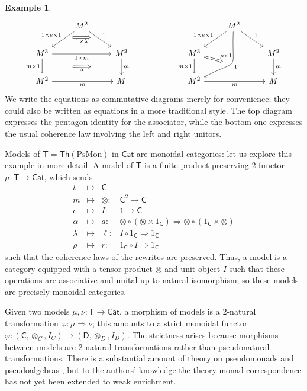 \documentclass{amsart}
\theoremstyle{definition}
\newtheorem{example}[theorem]{Example}
\newcommand{\Th}{\mathsf{Th}}
\newcommand{\Cat}{\mathsf{Cat}}
\newcommand{\D}{\mathsf{D}}
\newcommand{\C}{\mathsf{C}}
\newcommand{\T}{\mathsf{T}}
\newcommand{\maps}{\colon}
\begin{document}
\begin{example}
      \[\begin{tikzcd}
          & M^2 \ar[dl,"1\times e\times 1",""name=a1,swap] \ar[dr,"1",""name=a2] \arrow[Rightarrow,from=a1,to=a2,"1\times \lambda",swap,shorten >=0.4cm,shorten <=0.4cm] & && & M^2 \ar[dl,"1\times e\times 1",swap] \ar[dr,"1"] \ar[ddl,bend left =30,looseness=2, "1",""name=c1] & \\
          M^3 \ar[d,"m\times 1",swap,""name=b1] \ar[rr,"1\times m",swap] && M^2 \ar[d,"m",""name=b2] \arrow[Rightarrow,from=b1,to=b2,"\alpha",shorten >=1.3cm,shorten <=1.3cm,swap] & = & M^3 \ar[d,"m\times 1",swap] \arrow[Rightarrow,to=c1,"\rho\times 1",shorten >=0.4cm,shorten <=0.0cm] && M^2 \ar[d,"m"] \\
          M^2 \ar[rr,"m",swap] && M && M^2 \ar[rr,"m",swap] && M
        \end{tikzcd}\]
\noindent We write the equations as commutative diagrams merely for convenience; they could also be written as equations in a more traditional style.   The top diagram expresses the pentagon identity for the associator, while the bottom one expresses the usual coherence law involving the left and right unitors.
   
Models of $\T = \Th(\mathrm{PsMon})$ in $\Cat$ are monoidal categories: let us explore this example in more detail.  A model of $\T$ is a finite-product-preserving 2-functor $\mu\colon \T\to \Cat$, which sends 
\[\begin{array}{rccl}
	t & \mapsto& \C \\
	m & \mapsto & \otimes \maps &  \C^2 \to \C \\
	e & \mapsto & I \maps &  1\to \C \\
	\alpha & \mapsto & a \maps & \otimes \circ (\otimes \times 1_\C)  \Rightarrow  \otimes \circ (1_\C \times \otimes)\\
	\lambda & \mapsto & \ell \maps &  I\circ 1_\C  \Rightarrow  1_\C\\
	\rho & \mapsto & r \maps & 1_\C \circ I  \Rightarrow  1_\C
\end{array}\]
such that the coherence laws of the rewrites are preserved.  Thus, a model is a category equipped with a tensor product $\otimes$ and unit object $I$ such that these operations are associative and unital up to natural isomorphism; so these models are precisely monoidal categories.

Given two models $\mu,\nu\maps \T\to \Cat$, a morphism of models is a 2-natural transformation $\varphi\maps \mu \Rightarrow \nu$; this amounts to a strict monoidal functor $\varphi\maps (\C,\otimes_C,I_C)\to(\D,\otimes_D,I_D)$.  The strictness arises because morphisms between models are 2-natural transformations rather than pseudonatural transformations. There is a substantial amount of theory on pseudomonads and pseudoalgebras \cite{bkp,dubuc}, but to the authors' knowledge the theory-monad correspondence has not yet been extended to weak enrichment. 


\end{example}
\end{document}

